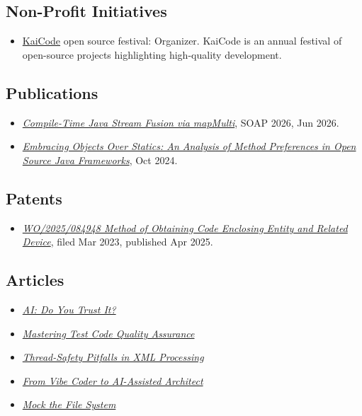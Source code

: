 \documentclass{vl}
\begin{document}
    \subsection*{Non-Profit Initiatives}
    \begin{itemize}
        \itemsep0em
        \item \href{https://www.kaicode.org}{KaiCode} open source festival: Organizer.
        KaiCode is an annual festival of open-source projects highlighting high-quality development.
    \end{itemize}

    \subsection*{Publications}
    \begin{itemize}
        \itemsep0em
        \item\emph{\href{https://doi.org/10.1145/3814987.3814988}{Compile-Time Java Stream Fusion via mapMulti}}, SOAP 2026, Jun 2026.
        \item\emph{\href{https://arxiv.org/abs/2410.05631}{Embracing Objects Over Statics:
        An Analysis of Method Preferences
        in Open Source Java Frameworks}}, Oct 2024.
    \end{itemize}

    \subsection*{Patents}
    \begin{itemize}
        \itemsep0em
        \item\emph{\href{https://patentscope.wipo.int/search/en/detail.jsf?docId=WO2025084948&_cid=P20-ME9V9B-07633-1}{WO/2025/084948 Method of Obtaining Code Enclosing Entity and Related Device}}, filed Mar 2023, published Apr 2025.
    \end{itemize}

    \subsection*{Articles}
    \begin{itemize}
        \itemsep0em
        \item\emph{\href{https://dzone.com/articles/ai-do-you-trust-it}{AI: Do You Trust It?}}
        \item\emph{\href{https://dzone.com/articles/mastering-test-code-quality-assurance}{Mastering Test Code Quality
        Assurance}}
        \item\emph{\href{https://dzone.com/articles/thread-safety-pitfalls-in-xml-processing}{Thread-Safety Pitfalls in XML Processing}}
        \item\emph{\href{https://dev.to/volodya-lombrozo/from-vibe-coder-to-ai-assisted-architect-1nao}{From Vibe Coder to AI-Assisted Architect}}
        \item\emph{\href{https://dzone.com/articles/mock-the-file-system}{Mock the File System}}
    \end{itemize}
\end{document}
